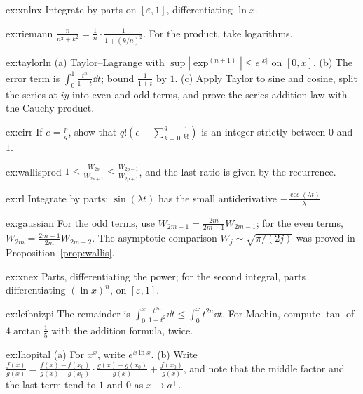 \begin{hint}{ex:xnlnx}
Integrate by parts on $[\varepsilon,1]$, differentiating $\ln x$.
\end{hint}
\begin{hint}{ex:riemann}
$\frac n{n^2+k^2}=\frac1n\cdot\frac1{1+(k/n)^2}$. For the product, take logarithms.
\end{hint}
\begin{hint}{ex:taylorln}
(a) Taylor--Lagrange with $\sup|\exp^{(n+1)}|\le e^{|x|}$ on $[0,x]$. (b) The error term is $\int_0^1\frac{t^n}{1+t}\dd t$; bound $\frac1{1+t}$ by $1$. (c) Apply Taylor to sine and cosine, split the series at $iy$
into even and odd terms, and prove the series addition law with the Cauchy product.
\end{hint}
\begin{hint}{ex:eirr}
If $e=\frac pq$, show that $q!\left(e-\sum_{k=0}^q\frac1{k!}\right)$ is an integer strictly between $0$ and $1$.
\end{hint}
\begin{hint}{ex:wallisprod}
$1\le\frac{W_{2p}}{W_{2p+1}}\le\frac{W_{2p-1}}{W_{2p+1}}$, and the last ratio is given by the recurrence.
\end{hint}
\begin{hint}{ex:rl}
Integrate by parts: $\sin(\lambda t)$ has the small antiderivative $-\frac{\cos(\lambda t)}\lambda$.
\end{hint}
\begin{hint}{ex:gaussian}
For the odd terms, use $W_{2m+1}=\frac{2m}{2m+1}W_{2m-1}$; for the even terms, $W_{2m}=\frac{2m-1}{2m}W_{2m-2}$. The asymptotic comparison $W_j\sim\sqrt{\pi/(2j)}$ was proved in Proposition~\ref{prop:wallis}.
\end{hint}
\begin{hint}{ex:xnex}
Parts, differentiating the power; for the second integral, parts differentiating $(\ln x)^n$, on $[\varepsilon,1]$.
\end{hint}
\begin{hint}{ex:leibnizpi}
The remainder is $\int_0^x\frac{t^{2n}}{1+t^2}\dd t\le\int_0^xt^{2n}\dd t$. For Machin, compute $\tan$ of $4\arctan\frac15$ with the addition formula, twice.
\end{hint}
\begin{hint}{ex:lhopital}
(a) For $x^x$, write $e^{x\ln x}$. (b) Write $\frac{f(x)}{g(x)}=\frac{f(x)-f(x_0)}{g(x)-g(x_0)}\cdot\frac{g(x)-g(x_0)}{g(x)}+\frac{f(x_0)}{g(x)}$, and note that the middle factor and the last term tend to $1$ and $0$ as $x\to a^+$.
\end{hint}
